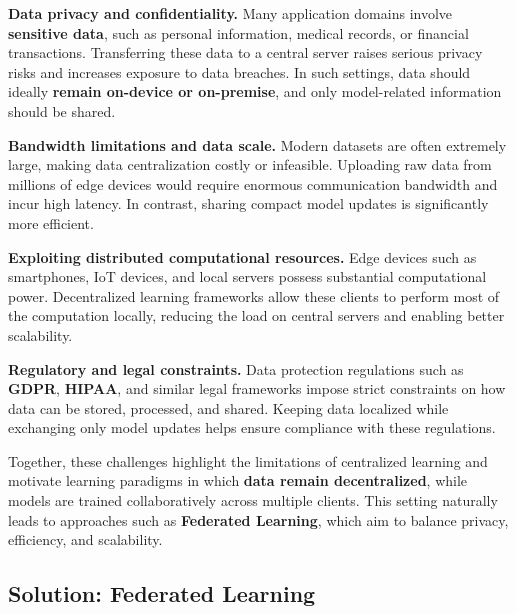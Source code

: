 \begin{compactitemize}
    \item \textbf{Data privacy and confidentiality.}  
    Many application domains involve \textbf{sensitive data}, such as personal information,
    medical records, or financial transactions. Transferring these data to a central server
    raises serious privacy risks and increases exposure to data breaches. In such settings,
    data should ideally \textbf{remain on-device or on-premise}, and only model-related
    information should be shared.

    \item \textbf{Bandwidth limitations and data scale.}  
    Modern datasets are often extremely large, making data centralization costly or
    infeasible. Uploading raw data from millions of edge devices would require enormous
    communication bandwidth and incur high latency. In contrast, sharing compact model
    updates is significantly more efficient.

    \item \textbf{Exploiting distributed computational resources.}  
    Edge devices such as smartphones, IoT devices, and local servers possess substantial
    computational power. Decentralized learning frameworks allow these clients to perform
    most of the computation locally, reducing the load on central servers and enabling
    better scalability.

    \item \textbf{Regulatory and legal constraints.}  
    Data protection regulations such as \textbf{GDPR}, \textbf{HIPAA}, and similar legal
    frameworks impose strict constraints on how data can be stored, processed, and shared.
    Keeping data localized while exchanging only model updates helps ensure compliance with
    these regulations.
\end{compactitemize}

Together, these challenges highlight the limitations of centralized learning and motivate
learning paradigms in which \textbf{data remain decentralized}, while models are trained
collaboratively across multiple clients. This setting naturally leads to approaches such as
\textbf{Federated Learning}, which aim to balance privacy, efficiency, and scalability.

\subsection{Solution: Federated Learning}

